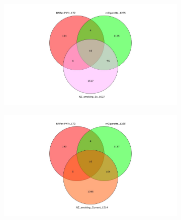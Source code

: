 \documentclass{article}
\begin{document}
\begin{figure}
    \begin{subfigure}{\textwidth}
        \centering
        \includegraphics[width=\linewidth]{Venn_NZEx.jpg}
    \end{subfigure}
\end{figure}

\begin{figure}
    \begin{subfigure}{\textwidth}
        \centering
        \includegraphics[width=\linewidth]{Venn_NZcurrent.jpg}
    \end{subfigure}
\end{figure}
\end{document}

